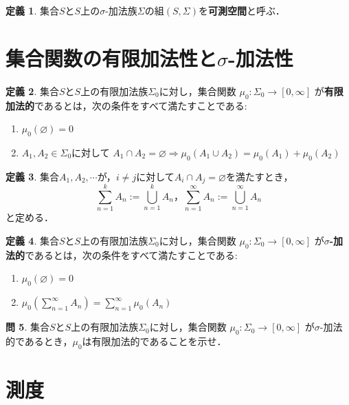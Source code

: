 \documentclass{jsreport}
\theoremstyle{definition}
\newtheorem{defi}{定義}[section]
\newtheorem{qst}[defi]{問}
\begin{document}
\begin{defi}\label{def_measurable_space}
集合$S$と$S$上の$\sigma$-加法族$\Sigma$の組$(S,\Sigma)$を\textbf{可測空間}と呼ぶ．
\end{defi}

\section{集合関数の有限加法性と$\sigma$-加法性}

\begin{defi}\label{def_additive}
集合$S$と$S$上の有限加法族$\Sigma_0$に対し，集合関数
$\mu_0\colon\Sigma_0\to[0,\infty]$
が\textbf{有限加法的}であるとは，次の条件をすべて満たすことである:
\begin{enumerate}
\item$\mu_0(\varnothing)=0$
\item$A_1,A_2\in\Sigma_0$に対して
$A_1 \cap A_2=\varnothing\Rightarrow\mu_0(A_1 \cup A_2)=\mu_0(A_1)+\mu_0(A_2)$
\end{enumerate}
\end{defi}

\begin{defi}\label{def_disjoint_union}
集合$A_1,A_2,\cdots$が，$i \neq j$に対して$A_i \cap A_j=\varnothing$を満たすとき，
\[ \sum_{n=1}^k A_n:=\bigcup_{n=1}^k A_n，\sum_{n=1}^\infty A_n:=\bigcup_{n=1}^\infty A_n \]
と定める．
\end{defi}

\begin{defi}\label{def_countably_additive}
集合$S$と$S$上の有限加法族$\Sigma_0$に対し，集合関数
$\mu_0\colon\Sigma_0\to[0,\infty]$
が\textbf{$\sigma$-加法的}であるとは，次の条件をすべて満たすことである:
\begin{enumerate}
\item$\mu_0(\varnothing)=0$
\item$\displaystyle\mu_0\left(\sum_{n=1}^\infty A_n\right)=\sum_{n=1}^\infty\mu_0(A_n)$
\end{enumerate}
\end{defi}

\begin{qst}\label{qst_countably_additive_then_additive}
集合$S$と$S$上の有限加法族$\Sigma_0$に対し，集合関数
$\mu_0\colon\Sigma_0\to[0,\infty]$
が$\sigma$-加法的であるとき，$\mu_0$は有限加法的であることを示せ．
\end{qst}

\section{測度}
\end{document}
